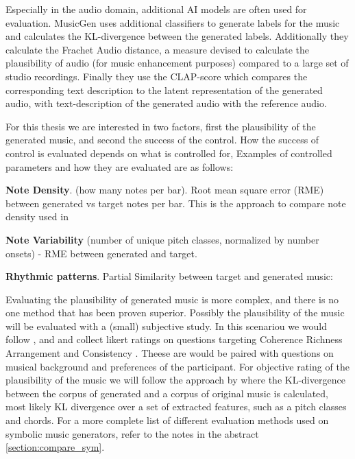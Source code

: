 Especially in the audio domain, additional AI models are often used for evaluation. MusicGen \cite{copet2023simple} uses additional classifiers to generate labels for the music and calculates the KL-divergence between the generated labels. Additionally they calculate the Frachet Audio distance, a measure devised to calculate the plausibility of audio (for music enhancement purposes) compared to a large set of studio recordings\cite{Kilgour_Frachet_2019}. Finally they use the CLAP-score which compares the corresponding text description to the latent representation of the generated audio, with text-description of the generated audio with the reference audio. \cite{Elizalde_Deshmukh_Ismail_Wang_2023}

For this thesis we are interested in two factors, first the plausibility of the generated music, and second the success of the control. How the success of control is evaluated depends on what is controlled for,  Examples of controlled parameters and how they are evaluated are as follows:

\textbf{Note Density}.  (how many notes per bar). Root mean square error (RME) between generated vs target notes per bar. This is the approach to compare note density used in \cite{Rütte_figaro_2023}

\textbf{Note Variability} (number of unique pitch classes, normalized by number onsets) - RME between generated and target.

\textbf{Rhythmic patterns}. Partial Similarity \cite{Volk_Garbers_VanKranenburg_Wiering_Grijp_Veltkamp_2009} between target and generated music: 

Evaluating the plausibility of generated music is more complex, and there is no one method that has been proven superior. Possibly the plausibility of the music will be evaluated with a (small) subjective study. In this scenariou we would follow \cite{Dong_Chen_MMT_Kirkpatrick_2023}, \cite{Yu_Lu_Wang_Hu_Tan_Ye_Zhang_museformer_2022} and \cite{Chen_Smith_Spijkervet_Wang_Zou_Li_Kong_Du_2024} and collect likert ratings on questions targeting Coherence Richness Arrangement and Consistency . Theese are would be paired with questions on musical background and preferences of the participant. 
For objective rating of the plausibility of the music we will follow the approach by \cite{Min_Jiang_Xia_Zhao_polyffusion_2023} where the KL-divergence between the corpus of generated and a corpus of original music is calculated, most likely KL divergence over a set of extracted features, such as a pitch classes and chords. For a more complete list of different evaluation methods used on symbolic music generators, refer to the notes in the abstract \ref{section:compare_sym}.
